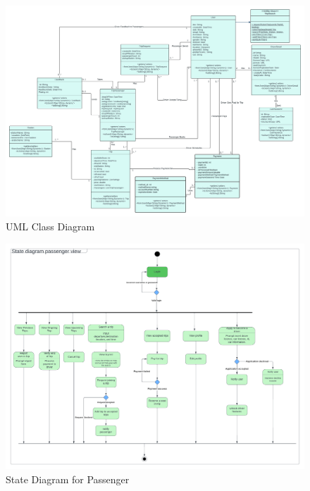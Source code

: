 \documentclass[a4paper, 12pt]{report} %
\begin{document}
        \FloatBarrier

        \begin{figure}
            \centering
            \includegraphics[width=\linewidth]{Images/UML Class.png}
            \caption{UML Class Diagram}
            \label{fig:class_diagram}
        \end{figure}

        \FloatBarrier
        
        \begin{figure}
            \centering
            \includegraphics[width=\linewidth]{Images/State Diagram passenger.png}
            \caption{State Diagram for Passenger}
            \label{fig:state_passenger}
        \end{figure}
\end{document}
